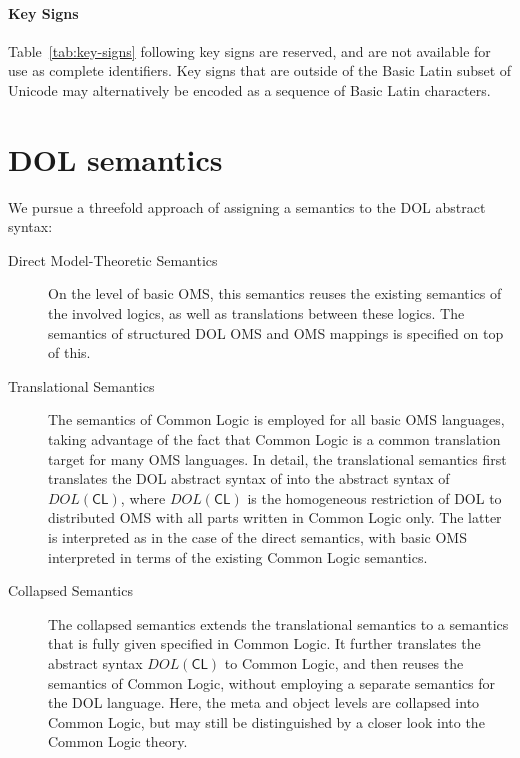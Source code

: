 \documentclass[10pt,%
\ifpretendfinal
final%
\else
draft%
\fi,
]{scrreprt}
\newcommand*{\CL}{\ensuremath{\mathsf{CL}}\xspace}
\newcommand{\clause}[1]{\chapter{#1}}
\newcommand{\sssclause}[1]{\subsubsection{#1}}
\begin{document}
\sssclause{Key Signs}

Table~\ref{tab:key-signs} following key signs are reserved, and are not available for use as complete identifiers.  Key signs that are outside of the Basic Latin subset of Unicode may alternatively be encoded as a sequence of Basic Latin characters.


\clause{DOL semantics}\label{c:semantics}

We pursue a threefold approach of assigning a semantics to the DOL
abstract syntax:

\begin{description}
\item[Direct Model-Theoretic Semantics] On the level of basic
  OMS, this semantics reuses the existing semantics of the
  involved logics, as well as translations between these logics.  The
  semantics of structured DOL OMS and OMS mappings is specified on
  top of this.
\item[Translational Semantics] The semantics of Common Logic is
  employed for all basic OMS languages, taking advantage of the
  fact that Common Logic is a common translation target for many
  OMS languages.  In detail, the translational semantics first
  translates the DOL abstract syntax of into the abstract syntax of
  $DOL(\CL)$, where $DOL(\CL)$ is the homogeneous restriction of DOL
  to distributed OMS with all parts written in Common Logic
  only.  The latter is interpreted as in the case of the direct
  semantics, with basic OMS interpreted in terms of the
  existing Common Logic semantics.
\item[Collapsed Semantics] The collapsed semantics extends the
  translational semantics to a semantics that is fully given specified
  in Common Logic.  It further translates the abstract syntax
  $DOL(\CL)$ to Common Logic, and then reuses the semantics of Common
  Logic, without employing a separate semantics for the DOL language.
  Here, the meta and object levels are collapsed into Common Logic,
  but may still be distinguished by a closer look into the Common
  Logic theory.

\end{description}
\end{document}
